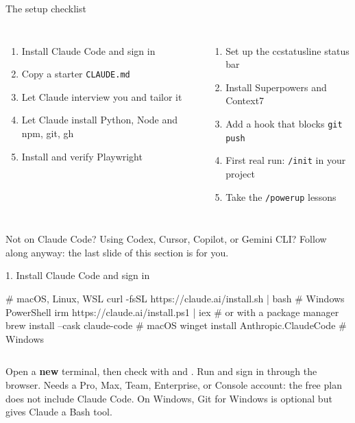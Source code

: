 \documentclass[aspectratio=169,11pt,t]{beamer}
\begin{document}
\begin{frame}{The setup checklist}
  \begin{columns}[T,onlytextwidth]
      \begin{enumerate}\small\setlength\itemsep{0.3em}
        \item Install Claude Code and sign in
        \item Copy a starter \texttt{CLAUDE.md}
        \item Let Claude interview you and tailor it
        \item Let Claude install Python, Node and npm, git, gh
        \item Install and verify Playwright
      \end{enumerate}
      \begin{enumerate}\small\setlength\itemsep{0.3em}\setcounter{enumi}{5}
        \item Set up the ccstatusline status bar
        \item Install Superpowers and Context7
        \item Add a hook that blocks \texttt{git push}
        \item First real run: \texttt{/init} in your project
        \item Take the \texttt{/powerup} lessons
      \end{enumerate}
  \end{columns}\par\vspace{0.6em}
  \begin{callout}{Not on Claude Code?}
    Using Codex, Cursor, Copilot, or Gemini CLI? Follow along anyway: the last slide of this section is for you.
  \end{callout}
\end{frame}

\begin{frame}[fragile]{1. Install Claude Code and sign in}
\begin{code}[basicstyle=\ttfamily\scriptsize\color{codefg}, deletecomment={[l]{//}}]
# macOS, Linux, WSL
curl -fsSL https://claude.ai/install.sh | bash
# Windows PowerShell
irm https://claude.ai/install.ps1 | iex
# or with a package manager
brew install --cask claude-code        # macOS
winget install Anthropic.ClaudeCode    # Windows
\end{code}
  \begin{columns}[T,onlytextwidth]
      \small Open a \textbf{new} terminal, then check with  and . Run  and sign in through the browser.
      \footnotesize\color{muted}Needs a Pro, Max, Team, Enterprise, or Console account: the free plan does not include Claude Code. On Windows, Git for Windows is optional but gives Claude a Bash tool.
  \end{columns}
\end{frame}
\end{document}
